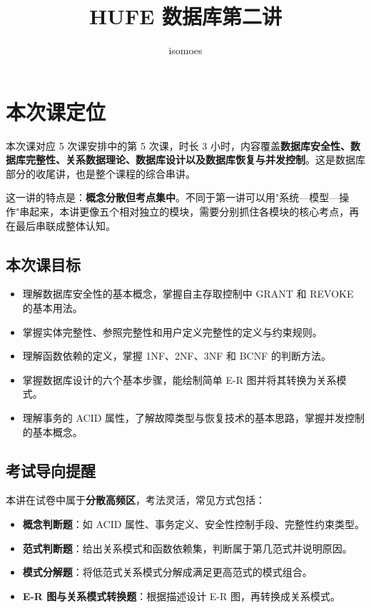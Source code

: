 \documentclass{../../note}
\title{HUFE 数据库第二讲}
\author{isomoes}
\begin{document}
\maketitle

\section{本次课定位}

本次课对应 5 次课安排中的第 5 次课，时长 3 小时，内容覆盖\textbf{数据库安全性、数据库完整性、关系数据理论、数据库设计以及数据库恢复与并发控制}。这是数据库部分的收尾讲，也是整个课程的综合串讲。

这一讲的特点是：\textbf{概念分散但考点集中}。不同于第一讲可以用"系统—模型—操作"串起来，本讲更像五个相对独立的模块，需要分别抓住各模块的核心考点，再在最后串联成整体认知。

\subsection{本次课目标}

\begin{itemize}
  \item 理解数据库安全性的基本概念，掌握自主存取控制中 GRANT 和 REVOKE 的基本用法。
  \item 掌握实体完整性、参照完整性和用户定义完整性的定义与约束规则。
  \item 理解函数依赖的定义，掌握 1NF、2NF、3NF 和 BCNF 的判断方法。
  \item 掌握数据库设计的六个基本步骤，能绘制简单 E-R 图并将其转换为关系模式。
  \item 理解事务的 ACID 属性，了解故障类型与恢复技术的基本思路，掌握并发控制的基本概念。
\end{itemize}

\subsection{考试导向提醒}

本讲在试卷中属于\textbf{分散高频区}，考法灵活，常见方式包括：

\begin{itemize}
  \item \textbf{概念判断题}：如 ACID 属性、事务定义、安全性控制手段、完整性约束类型。
  \item \textbf{范式判断题}：给出关系模式和函数依赖集，判断属于第几范式并说明原因。
  \item \textbf{模式分解题}：将低范式关系模式分解成满足更高范式的模式组合。
  \item \textbf{E-R 图与关系模式转换题}：根据描述设计 E-R 图，再转换成关系模式。
\end{itemize}
\end{document}
